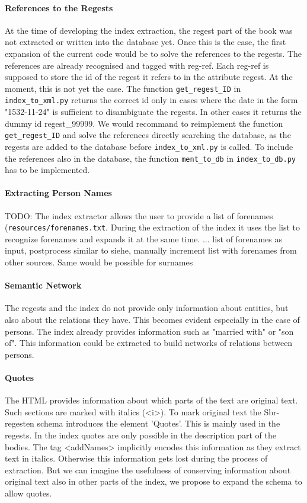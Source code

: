 \paragraph{References to the Regests}
At the time of developing the index extraction, the regest part of the book was not extracted or written into the database yet. Once this is the case, the first expansion of the current code would be to solve the references to the regests. The references are already recognised and tagged with reg-ref. Each reg-ref is supposed to store the id of the regest it refers to in the attribute regest. At the moment, this is not yet the case. The function \texttt{get\_regest\_ID} in \texttt{index\_to\_xml.py} returns the correct id only in cases where the date in the form "1532-11-24" is sufficient to disambiguate the regests. In other cases it returns the dummy id regest\_99999. We would recommand to reimplement the function \texttt{get\_regest\_ID} and solve the references directly searching the database, as the regests are added to the database before \texttt{index\_to\_xml.py} is called. To include the references also in the database, the function \texttt{ment\_to\_db} in \texttt{index\_to\_db.py} has to be implemented.

\paragraph{Extracting Person Names}
TODO: The index extractor allows the user to provide a list of forenames (\texttt{resources/forenames.txt}. During the extraction of the index it uses the list to recognize forenames and expands it at the same time. ...
list of forenames as input, postprocess similar to siehe, manually increment list with forenames from other sources. Same would be possible for surnames

\paragraph{Semantic Network}
The regests and the index do not provide only information about entities, but also about the relations they have. This becomes evident especially in the case of persons. The index already provides information such as "married with" or "son of". This information could be extracted to build networks of relations between persons.

\paragraph{Quotes}
The HTML provides information about which parts of the text are original text. Such sections are marked with italics (<i>). To mark original text the Sbr-regesten schema introduces the element 'Quotes'. This is mainly used in the regests. In the index quotes are only possible in the description part of the bodies. The tag <addNames> implicitly encodes this information as they extract text in italics. Otherwise this information gets lost during the process of extraction. But we can imagine the usefulness of conserving information about original text also in other parts of the index, we propose to expand the schema to allow quotes.


